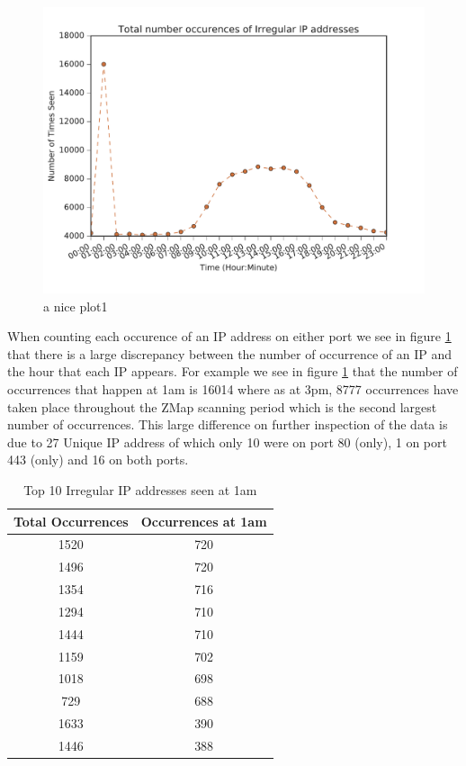 \documentclass[a4wide,leqno,12pt]{report}
\begin{document}
\begin{figure}[h!]
\includegraphics[scale=.5]{pdf_images/TotalNumberOccurencesOfIrregularIPaddressesOnAverage}
\caption{a nice plot1}
\label{fig:irreg_occurence}
\end{figure}
When counting each occurence of an IP address on either port we see in figure \ref{fig:irreg_occurence} that there is a large discrepancy between the number of occurrence of an IP and the hour that each IP appears. For example we see in figure \ref{fig:irreg_occurence} that the number of occurrences that happen at 1am is 16014 where as at 3pm, 8777 occurrences have taken place throughout the ZMap scanning period which is the second largest number of occurrences. This large difference on further inspection of the data is due to 27 Unique IP address of which only 10 were on port 80 (only), 1 on port 443 (only) and 16 on both ports.



\begin{table}
\centering
\begin{tabular}{|| c c ||}
 \hline
  Total Occurrences & Occurrences at 1am  \\ [0.5ex]
 \hline\hline
 1520 & 720  \\
 1496 & 720 \\
 1354 & 716 \\
 1294 & 710  \\
 1444 & 710 \\
 1159 & 702 \\
 1018 & 698 \\
 729 & 688  \\
 1633 & 390 \\
 1446 & 388 \\[1ex]
 \hline
\end{tabular}
\caption{Top 10 Irregular IP addresses seen at 1am }
\label{table:2}
\end{table}
\end{document}
